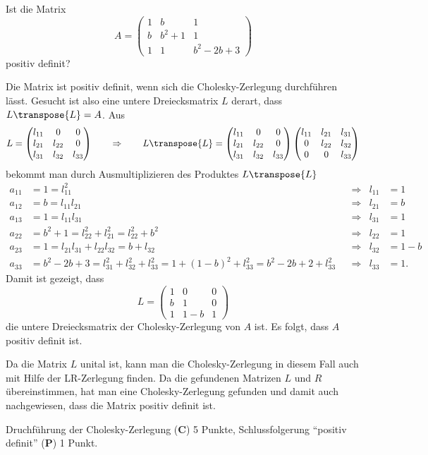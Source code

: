 Ist die Matrix
\[
A=\begin{pmatrix}
1&b&1\\
b&b^2+1&1 \\
1&1&b^2-2b+3
\end{pmatrix}
\]
positiv definit?

\begin{loesung}
Die Matrix ist positiv definit, wenn sich die Cholesky-Zerlegung 
durchführen lässt.
Gesucht ist also eine untere Dreiecksmatrix $L$ derart, dass $L\transpose{L}=A$.
Aus
\[
L
=
\begin{pmatrix}
l_{11}&0&0\\
l_{21}&l_{22}&0\\
l_{31}&l_{32}&l_{33}
\end{pmatrix}
\qquad\Rightarrow\qquad
L\transpose{L}
=
\begin{pmatrix}
l_{11}&0&0\\
l_{21}&l_{22}&0\\
l_{31}&l_{32}&l_{33}
\end{pmatrix}
\begin{pmatrix}
l_{11}&l_{21}&l_{31}\\
0&l_{22}&l_{32}\\
0&0&l_{33}
\end{pmatrix}
\]
bekommt man durch Ausmultiplizieren des Produktes $L\transpose{L}$
\begin{align*}
a_{11}&=1=l_{11}^2 &&\Rightarrow&l_{11}&=1
\\
a_{12}&=b=l_{11}l_{21}&&\Rightarrow&l_{21}&=b
\\
a_{13}&=1=l_{11}l_{31}&&\Rightarrow&l_{31}&=1
\\
a_{22}&=b^2+1=l_{22}^2+l_{21}^2=l_{22}^2+b^2&&\Rightarrow&l_{22}&=1
\\
a_{23}&=1=l_{21}l_{31}+l_{22}l_{32}=b+l_{32}&&\Rightarrow&l_{32}&=1-b
\\
a_{33}&=b^2-2b+3=l_{31}^2+l_{32}^2+l_{33}^2=1+(1-b)^2+l_{33}^2=b^2-2b+2+l_{33}^2
&&\Rightarrow&l_{33}&=1.
\end{align*}
Damit ist gezeigt, dass
\[
L=\begin{pmatrix}
1&0&0\\
b&1&0\\
1&1-b&1
\end{pmatrix}
\]
die untere Dreiecksmatrix der Cholesky-Zerlegung von $A$ ist.
Es folgt, dass $A$ positiv definit ist.
\end{loesung}

\begin{diskussion}
Da die Matrix $L$ unital ist, kann man die Cholesky-Zerlegung in diesem 
Fall auch mit Hilfe der LR-Zerlegung finden.
Da die gefundenen Matrizen $L$ und $R$ übereinstimmen, hat man eine
Cholesky-Zerlegung gefunden und damit auch nachgewiesen, dass die
Matrix positiv definit ist.
\end{diskussion}

\begin{bewertung}
Druchführung der Cholesky-Zerlegung ({\bf C}) 5 Punkte,
Schlussfolgerung ``positiv definit'' ({\bf P}) 1 Punkt.
\end{bewertung}

